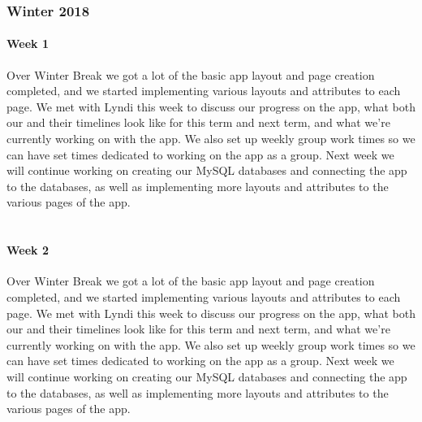 \documentclass[onecolumn, draftclsnofoot,10pt, compsoc]{IEEEtran}
\begin{document}
    \subsubsection{Winter 2018}
      \paragraph{Week 1}
      Over Winter Break we got a lot of the basic app layout and page creation completed, and we started implementing various layouts and attributes to each page. We met with Lyndi this week to discuss our progress on the app, what both our and their timelines look like for this term and next term, and what we're currently working on with the app. We also set up weekly group work times so we can have set times dedicated to working on the app as a group. Next week we will continue working on creating our MySQL databases and connecting the app to the databases, as well as implementing more layouts and attributes to the various pages of the app. \\ \\

      \paragraph{Week 2}
      Over Winter Break we got a lot of the basic app layout and page creation completed, and we started implementing various layouts and attributes to each page. We met with Lyndi this week to discuss our progress on the app, what both our and their timelines look like for this term and next term, and what we're currently working on with the app. We also set up weekly group work times so we can have set times dedicated to working on the app as a group. Next week we will continue working on creating our MySQL databases and connecting the app to the databases, as well as implementing more layouts and attributes to the various pages of the app. \\ \\
\end{document}
